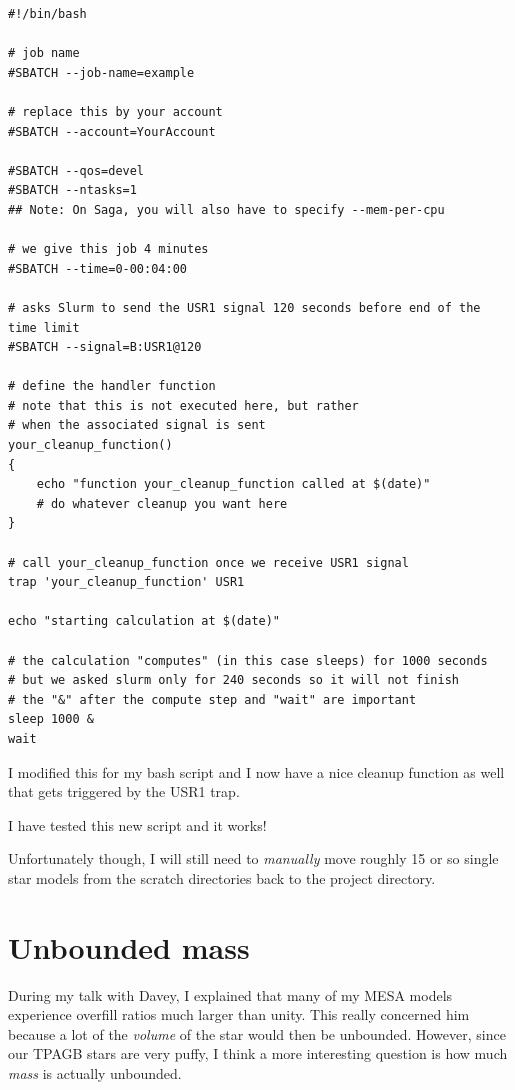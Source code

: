 \documentclass[a4paper,10pt]{article}
\begin{document}
\begin{verbatim}
#!/bin/bash

# job name
#SBATCH --job-name=example

# replace this by your account
#SBATCH --account=YourAccount

#SBATCH --qos=devel
#SBATCH --ntasks=1
## Note: On Saga, you will also have to specify --mem-per-cpu

# we give this job 4 minutes
#SBATCH --time=0-00:04:00

# asks Slurm to send the USR1 signal 120 seconds before end of the time limit
#SBATCH --signal=B:USR1@120

# define the handler function
# note that this is not executed here, but rather
# when the associated signal is sent
your_cleanup_function()
{
    echo "function your_cleanup_function called at $(date)"
    # do whatever cleanup you want here
}

# call your_cleanup_function once we receive USR1 signal
trap 'your_cleanup_function' USR1

echo "starting calculation at $(date)"

# the calculation "computes" (in this case sleeps) for 1000 seconds
# but we asked slurm only for 240 seconds so it will not finish
# the "&" after the compute step and "wait" are important
sleep 1000 &
wait
\end{verbatim}

I modified this for my bash script and I now have a nice cleanup function as well that gets triggered by the
USR1 trap.

I have tested this new script and it works!

Unfortunately though, I will still need to \emph{manually} move roughly 15 or so single star models from the
scratch directories back to the project directory.

\section{Unbounded mass}

During my talk with Davey, I explained that many of my MESA models experience overfill ratios much larger than unity.
This really concerned him because a lot of the \emph{volume} of the star would then be unbounded.
However, since our
TPAGB stars are very puffy, I think a more interesting question is how much \emph{mass} is actually unbounded.

\begin{figure}[ht]
	\centering
\end{figure}
\end{document}
